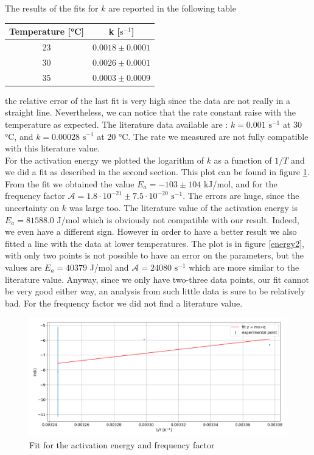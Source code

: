 \documentclass[a4paper,10pt]{article}
\begin{document}
The results of the fits for $k$ are reported in the following table
\begin{table}[H]
\centering
\begin{tabular}{c|c}
 Temperature [°C] & k [$\text{s}^{-1}$] \\
  \hline
  23 & $0.0018\pm 0.0001$ \\
 
   30 & $0.0026\pm 0.0001 $ \\
  
  35 & $0.0003\pm  0.0009$\\
  \hline
\end{tabular}
\end{table} 
the relative error of the last fit is very high since the data are not really in a straight line. Nevertheless, we can notice that the rate constant raise with the temperature as expected. The literature data available are \cite{k}: $k = 0.001$ $\text{s}^{-1}$ at 30 °C, and $k = 0.00028$ $\text{s}^{-1}$ at 20 °C. The rate we measured are not fully compatible with this literature value.\\
For the activation energy we plotted the logarithm of $k$ as a function of $1/T$ and we did a fit as described in the second section. This plot can be found in figure \ref{energy}. From the fit we obtained the value $E_a = -103 \pm 104$ kJ/mol, and for the frequency factor $\mathcal{A} = 1.8\cdot 10^{-21}\pm7.5\cdot 10^{-20}$ $\text{s}^{-1}$. The errors are huge, since the uncertainty on $k$ was large too. The literature value \cite{k} of the activation energy is $E_a = 81588.0$ J/mol which is obviously not compatible with our result. Indeed, we even have a different sign. However in order to have a better result we also fitted a line with the data at lower temperatures. The plot is in figure \ref{energy2}, with only two points is not possible to have an error on the parameters, but the values are $E_a = 40379$ J/mol and $\mathcal{A} = 24080$ $\text{s}^{-1}$ which are more similar to the literature value. Anyway, since we only have two-three data points, our fit cannot be very good either way, an analysis from such little data is sure to be relatively bad. For the frequency factor we did not find a literature value. 
\begin{figure}[H]
\centering
\includegraphics[width=\textwidth]{energy}
\caption{Fit for the activation energy and frequency factor}\label{energy}
\end{figure}
\end{document}
